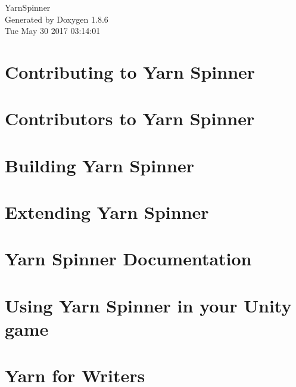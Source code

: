 \documentclass[twoside]{book}
\newcommand{\clearemptydoublepage}{%
  \newpage{\pagestyle{empty}\cleardoublepage}%
}
\begin{document}
\hypersetup{pageanchor=false}
\begin{titlepage}
\vspace*{7cm}
\begin{center}%
{\Large Yarn\-Spinner }\\
\vspace*{1cm}
{\large Generated by Doxygen 1.8.6}\\
\vspace*{0.5cm}
{\small Tue May 30 2017 03:14:01}\\
\end{center}
\end{titlepage}
\clearemptydoublepage
\tableofcontents
\clearemptydoublepage
{}
\hypersetup{pageanchor=true}

\chapter{Contributing to Yarn Spinner}
\label{d7/d46/a00002}
\hypertarget{d7/d46/a00002}{}

\chapter{Contributors to Yarn Spinner}
\label{d0/d0b/a00004}
\hypertarget{d0/d0b/a00004}{}

\chapter{Building Yarn Spinner}
\label{de/d21/a00006}
\hypertarget{de/d21/a00006}{}

\chapter{Extending Yarn Spinner}
\label{d4/dee/a00008}
\hypertarget{d4/dee/a00008}{}

\chapter{Yarn Spinner Documentation}
\label{d7/dec/a00010}
\hypertarget{d7/dec/a00010}{}

\chapter{Using Yarn Spinner in your Unity game}
\label{df/d86/a00012}
\hypertarget{df/d86/a00012}{}

\chapter{Yarn for Writers}
\label{d2/de7/a00014}
\hypertarget{d2/de7/a00014}{}

\end{document}
